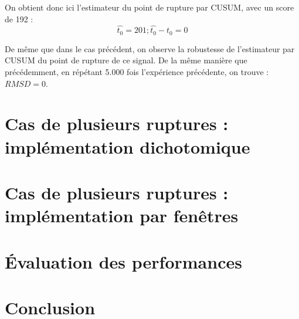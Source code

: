 \documentclass[french,12pt,notitlepage]{report}
\begin{document}
	On obtient donc ici l'estimateur du point de rupture par CUSUM, avec un score de 192 :
	\begin{equation*}
		\hat{t_0} = 201 ; \hat{t_0} - t_0 = 0
	\end{equation*}
	
	De même que dans le cas précédent, on observe la robustesse de l'estimateur par CUSUM du point de rupture de ce signal. De la même manière que précédemment, en répétant 5.000 fois l'expérience précédente, on trouve : $RMSD = 0$.
	
	\chapter{Cas de plusieurs ruptures : implémentation dichotomique}
	
	\chapter{Cas de plusieurs ruptures : implémentation par fenêtres}
	
	\chapter{Évaluation des performances}
	
	\chapter{Conclusion}
\end{document}
